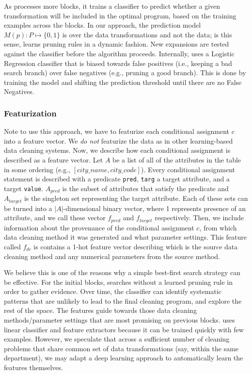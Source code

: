 As \sys processes more blocks, it trains a classifier to predict whether a given transformation will be included in the optimal program, based on the training examples across the blocks.  In our approach, the prediction model $M(p): P \mapsto \{0,1\}$ is over the data transformations and not the data; is this sense, \sys learns pruning rules in a dynamic fashion. 
New expansions are tested against the classifier before the algorithm proceeds.
Internally, \sys uses a Logistic Regression classifier that is biased towards false positives (i.e., keeping a bad search branch) over false negatives (e.g., pruning a good branch). This is done by training the model and shifting the prediction threshold until there are no False Negatives. 

\subsubsection{Featurization}
Note to use this approach, we have to featurize each conditional assignment $c$ into a feature vector.
We \emph{do not} featurize the data as in other learning-based data cleaning systems.
Now, we describe how each conditional assignment is described as a feature vector.
Let $A$ be a list of all of the attributes in the table in some ordering (e.g., $[city\_name, city\_code]$).
Every conditional assignment statement is described with a predicate \texttt{pred}, \texttt{targ} a target attribute, and a target \texttt{value}. 
$A_{pred}$ is the subset of attributes that satisfy the predicate and $A_{target}$ is the singleton set representing the target attribute.
Each of these sets can be turned into a $|A|$-dimensional binary vector, where 1 represents presence of an attribute, and we call these vector $f_{pred}$ and $f_{target}$ respectively.
Then, we include information about the provenance of the conditional assignment $c$, from which data cleaning method it was generated and what parameter settings.
This feature called $f_{dc}$ is contains a 1-hot feature vector describing which is the source data cleaning method and any numerical parameters from the source method. 

We believe this is one of the reasons why a simple best-first search strategy can be effective.  For the initial blocks, \sys searches without a learned pruning rule in order to gather evidence.  Over time, the classifier can identify systematic patterns that are unlikely to lead to the final cleaning program, and explore the rest of the space.  
The features guide \sys towards those data cleaning methods/parameter settings that are most promising on previous blocks.
 \sys uses linear classifier and feature extractors because it can be trained quickly with few examples.   However, we speculate that across a sufficient number of cleaning problems that share common set of data transformations (say, within the same department), we may adapt a deep learning approach to automatically learn the features themselves. 
 
